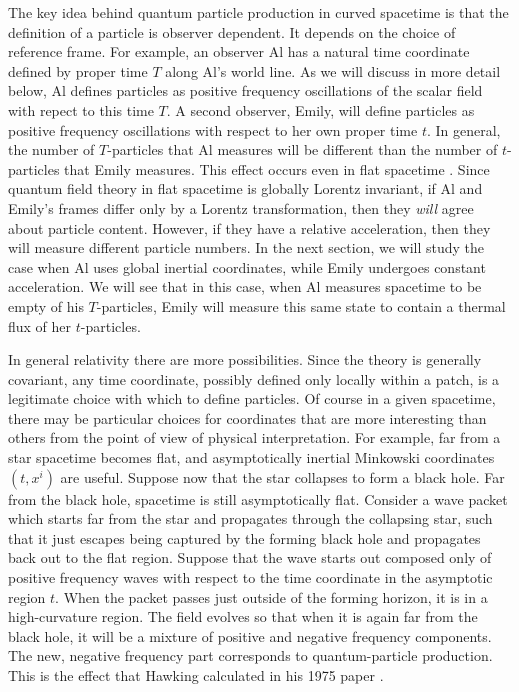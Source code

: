 \documentclass[12pt]{article}
\begin{document}
The key idea behind quantum particle production in curved spacetime is
that the definition of a particle is observer dependent.  It depends
on the choice of reference frame.  For example, an observer Al has a natural
time coordinate defined by proper time $T$ along Al's world line.
As we will discuss in more detail below, Al defines
particles as positive frequency oscillations of the scalar field with
repect to this time
$T$.  A second observer, Emily, will define particles as positive frequency
oscillations with
respect to her own proper time $t$. In general, the number of $T$-particles
that Al measures
will be different than the number of $t$-particles that Emily measures.
This effect occurs even in flat spacetime \cite{fulling,unruh}.
Since quantum field theory in flat spacetime is globally Lorentz invariant,
if Al
and Emily's frames differ only by a Lorentz transformation, then they
{\it will} agree about particle content.  However, if they have a
relative acceleration, then they will measure different particle numbers.
In the next section, we will study the case when Al uses
global inertial coordinates, while Emily undergoes constant acceleration.
We will see that in this case, when Al measures spacetime to be empty of
his $T$-particles,
Emily will measure this same state to contain a thermal flux of her
$t$-particles.

In general relativity there are more possibilities. Since the
theory is generally covariant, any time coordinate, possibly defined only
locally within a
patch, is a legitimate choice with which to define particles.  Of course in
a given
spacetime, there may be particular choices for coordinates that are more
interesting than
others from the point of view of physical interpretation. For example, far
from a star
spacetime becomes flat, and asymptotically inertial Minkowski
coordinates $(t, x^i )$ are useful.  Suppose now that the star collapses to form a black
hole.  Far from the black hole, spacetime is still asymptotically flat.
Consider a wave packet which starts far from the star and
propagates through the collapsing star,
such that it just escapes being captured by the forming black hole and
propagates back out
to the flat region.
Suppose that the wave starts out composed only of positive frequency
waves with respect to the time coordinate in the asymptotic region $t$.
When the packet
passes just outside of the forming horizon, it is in a high-curvature
region.  The field
evolves so that when it is again far from the black hole, it will be a
mixture of positive
and negative frequency components. The new, negative frequency part
corresponds to
quantum-particle production. This is the effect that Hawking calculated in
his 1975 paper
\cite{hawking}.
\end{document}
